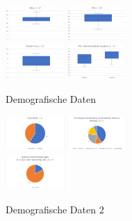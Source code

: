 \documentclass[conference]{IEEEtran}
\begin{document}
\begin{figure}[ht]
	\centering
	\includegraphics[width=0.2\textwidth]{assets/alter.png} \hspace{-5pt}
	\includegraphics[width=0.2\textwidth]{assets/ipd.png} \\
	\vspace{2pt}
	\includegraphics[width=0.2\textwidth]{assets/randot.png} \hspace{-5pt}
	\includegraphics[width=0.2\textwidth]{assets/ipd_mvw.png}\\
	\caption{Demografische Daten}
	\label{fig:Demografische Daten}
\end{figure}

\begin{figure}[ht]
	\centering
	\includegraphics[width=0.2\textwidth]{assets/gesch.png} \hspace{-5pt}
	\includegraphics[width=0.2\textwidth]{assets/headset.png} \\
	\vspace{2pt}
	\includegraphics[width=0.2\textwidth]{assets/optBeein.png} 
	\caption{Demografische Daten 2}
	\label{fig:Demografische Daten 2}
\end{figure}
\end{document}

